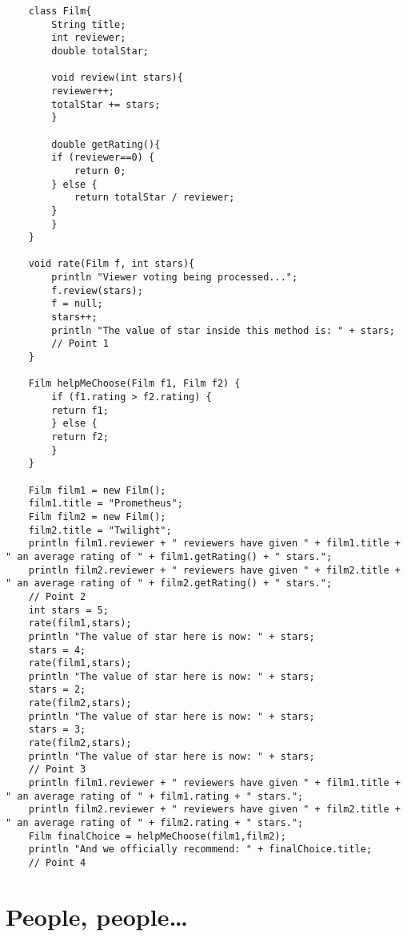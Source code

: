 \documentclass{article}
\begin{document}
\begin{verbatim}
    class Film{
        String title;
        int reviewer;
        double totalStar;     
      
        void review(int stars){
        reviewer++;
        totalStar += stars;
        }
      
        double getRating(){
        if (reviewer==0) {
            return 0;
        } else {
            return totalStar / reviewer;
        }
        }
    }
    
    void rate(Film f, int stars){
        println "Viewer voting being processed...";
        f.review(stars);
        f = null;
        stars++;
        println "The value of star inside this method is: " + stars;
        // Point 1
    }
    
    Film helpMeChoose(Film f1, Film f2) {
        if (f1.rating > f2.rating) {
        return f1;
        } else {
        return f2;
        }
    }
    
    Film film1 = new Film();
    film1.title = "Prometheus";
    Film film2 = new Film();
    film2.title = "Twilight";
    println film1.reviewer + " reviewers have given " + film1.title + " an average rating of " + film1.getRating() + " stars.";
    println film2.reviewer + " reviewers have given " + film2.title + " an average rating of " + film2.getRating() + " stars.";
    // Point 2
    int stars = 5;
    rate(film1,stars);
    println "The value of star here is now: " + stars;
    stars = 4;
    rate(film1,stars);
    println "The value of star here is now: " + stars;
    stars = 2;
    rate(film2,stars);
    println "The value of star here is now: " + stars;
    stars = 3;
    rate(film2,stars);
    println "The value of star here is now: " + stars;
    // Point 3
    println film1.reviewer + " reviewers have given " + film1.title + " an average rating of " + film1.rating + " stars.";
    println film2.reviewer + " reviewers have given " + film2.title + " an average rating of " + film2.rating + " stars.";
    Film finalChoice = helpMeChoose(film1,film2);
    println "And we officially recommend: " + finalChoice.title;
    // Point 4
\end{verbatim}


\section{People, people\ldots}
\label{sec:people-peopleldots}
\end{document}
